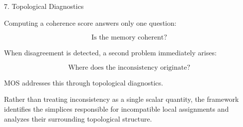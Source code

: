 %
%

\begin{mosbox}{7. Topological Diagnostics}

\BodyFont

Computing a coherence score answers only one question:

\[
\boxed{
\text{Is the memory coherent?}
}
\]

When disagreement is detected, a second problem immediately arises:

\[
\boxed{
\text{Where does the inconsistency originate?}
}
\]

MOS addresses this through topological diagnostics.

Rather than treating inconsistency as a single scalar quantity, the
framework identifies the simplices responsible for incompatible local
assignments and analyzes their surrounding topological structure.

\end{mosbox}


\vspace{6mm}

\begin{center}


\end{center}

